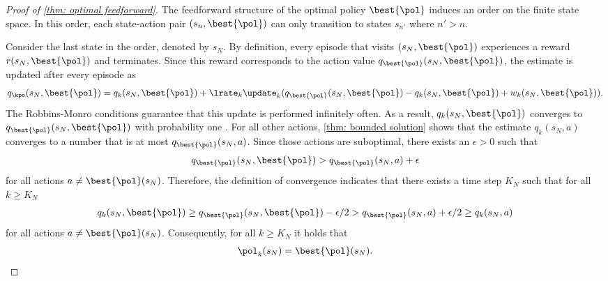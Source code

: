 \begin{proof}[Proof of \autoref{thm: optimal feedforward}]
The feedforward structure of the optimal policy $\best{\pol}$ induces an order on the finite state space.
In this order, each state-action pair $(s_n, \best{\pol})$ can only transition to states $s_{n'}$ where $n' > n$.

Consider the last state in the order, denoted by $s_N$.
By definition, every episode that visits $(s_N, \best{\pol})$ experiences a reward $r(s_N, \best{\pol})$ and terminates.
Since this reward corresponds to the action value $q_{\best{\pol}}(s_N, \best{\pol})$, the estimate is updated after every episode as
\begin{align*}
    q_\kpo(s_N, \best{\pol})
    =
    q_k(s_N, \best{\pol})
    + \lrate_k \update_k ( q_{\best{\pol}}(s_N, \best{\pol}) - q_k(s_N, \best{\pol}) + w_k(s_N, \best{\pol}) ) .
\end{align*}
The Robbins-Monro conditions guarantee that this update is performed infinitely often. As a result, $q_k(s_N, \best{\pol})$ converges to $q_{\best{\pol}}(s_N, \best{\pol})$ with probability one \citep[Example 4.3]{Bertsekas1996Neuro-DynamicProgramming}.
For all other actions, \autoref{thm: bounded solution} shows that the estimate $q_k(s_N, a)$ converges to a number that is at most $q_{\best{\pol}}(s_N, a)$. Since those actions are suboptimal, there exists an $\epsilon>0$ such that
\begin{align*}
    q_{\best{\pol}}(s_N, \best{\pol}) > q_{\best{\pol}}(s_N, a) + \epsilon
\end{align*}
for all actions $a \neq \best{\pol}(s_N)$.
Therefore, the definition of convergence indicates that there exists a time step $K_N$ such that for all $k \geq K_N$
\begin{align*}
    q_k(s_N, \best{\pol}) 
    \geq q_{\best{\pol}}(s_N, \best{\pol}) - \epsilon/2 
    > q_{\best{\pol}}(s_N, a) + \epsilon/2 
    \geq q_k(s_N, a) 
\end{align*}
for all actions $a \neq \best{\pol}(s_N)$.
Consequently, for all $k \geq K_N$ it holds that
\begin{align*}
    \pol_k(s_N) = \best{\pol}(s_N) .
\end{align*}


\end{proof}
